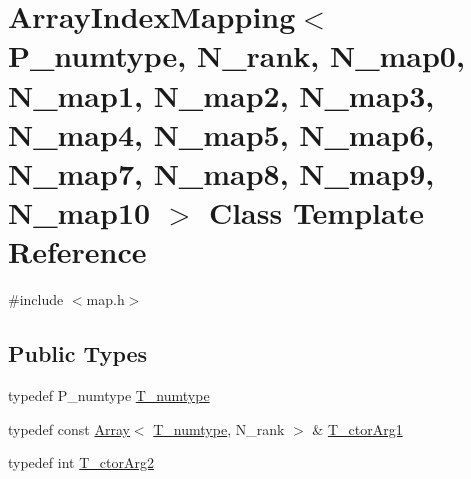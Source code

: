\hypertarget{classArrayIndexMapping}{}\section{Array\+Index\+Mapping$<$ P\+\_\+numtype, N\+\_\+rank, N\+\_\+map0, N\+\_\+map1, N\+\_\+map2, N\+\_\+map3, N\+\_\+map4, N\+\_\+map5, N\+\_\+map6, N\+\_\+map7, N\+\_\+map8, N\+\_\+map9, N\+\_\+map10 $>$ Class Template Reference}
\label{classArrayIndexMapping}


{\ttfamily \#include $<$map.\+h$>$}

\subsection*{Public Types}
\begin{DoxyCompactItemize}
\item 
typedef P\+\_\+numtype \hyperlink{classArrayIndexMapping_a650b2e3c2658a771235ae3cc4692e331}{T\+\_\+numtype}
\item 
typedef const \hyperlink{classArray}{Array}$<$ \hyperlink{classArrayIndexMapping_a650b2e3c2658a771235ae3cc4692e331}{T\+\_\+numtype}, N\+\_\+rank $>$ \& \hyperlink{classArrayIndexMapping_ae416ca742eadc2243d3e13d4ee1b287c}{T\+\_\+ctor\+Arg1}
\item 
typedef int \hyperlink{classArrayIndexMapping_a075b000a9bf0680c71b6299c05d04124}{T\+\_\+ctor\+Arg2}
\end{DoxyCompactItemize}

